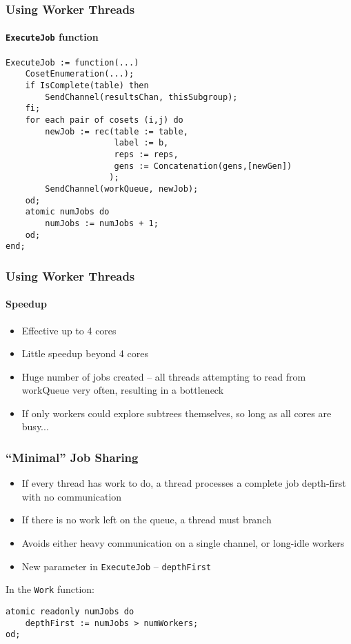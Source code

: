 \documentclass{beamer}
\begin{document}
\begin{frame}[fragile]
  \frametitle{Using Worker Threads}
  \framesubtitle{\texttt{ExecuteJob} function}
\begin{verbatim}
ExecuteJob := function(...)
    CosetEnumeration(...);
    if IsComplete(table) then
        SendChannel(resultsChan, thisSubgroup);
    fi;
    for each pair of cosets (i,j) do
        newJob := rec(table := table,
                      label := b,
                      reps := reps,
                      gens := Concatenation(gens,[newGen])
                     );
        SendChannel(workQueue, newJob);
    od;
    atomic numJobs do
        numJobs := numJobs + 1;
    od;
end;
\end{verbatim}
\end{frame}

\begin{frame}
  \frametitle{Using Worker Threads}
  \framesubtitle{Speedup} \pause
  \begin{itemize}
  \item Effective up to 4 cores
  \item Little speedup beyond 4 cores \pause
  \item Huge number of jobs created -- all threads attempting to read from workQueue very often, resulting in a bottleneck \pause
  \item If only workers could explore subtrees themselves, so long as all cores are busy...
  \end{itemize}
\end{frame}

\begin{frame}[fragile]
  \frametitle{``Minimal'' Job Sharing} \pause
  \begin{itemize}
  \item If every thread has work to do, a thread processes a complete job depth-first with no communication \pause
  \item If there is no work left on the queue, a thread must branch \pause
  \item Avoids either heavy communication on a single channel, or long-idle workers \pause
  \item New parameter in \texttt{ExecuteJob} -- \texttt{depthFirst} \pause
  \end{itemize}
In the \texttt{Work} function:
\begin{verbatim}
atomic readonly numJobs do
    depthFirst := numJobs > numWorkers;
od;
\end{verbatim}
\end{frame}
\end{document}
